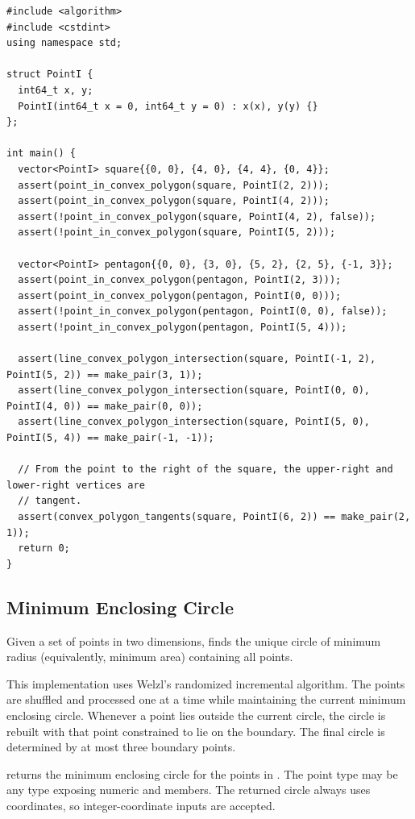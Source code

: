 \begin{lstlisting}[style=cpp]
#include <algorithm>
#include <cstdint>
using namespace std;

struct PointI {
  int64_t x, y;
  PointI(int64_t x = 0, int64_t y = 0) : x(x), y(y) {}
};

int main() {
  vector<PointI> square{{0, 0}, {4, 0}, {4, 4}, {0, 4}};
  assert(point_in_convex_polygon(square, PointI(2, 2)));
  assert(point_in_convex_polygon(square, PointI(4, 2)));
  assert(!point_in_convex_polygon(square, PointI(4, 2), false));
  assert(!point_in_convex_polygon(square, PointI(5, 2)));

  vector<PointI> pentagon{{0, 0}, {3, 0}, {5, 2}, {2, 5}, {-1, 3}};
  assert(point_in_convex_polygon(pentagon, PointI(2, 3)));
  assert(point_in_convex_polygon(pentagon, PointI(0, 0)));
  assert(!point_in_convex_polygon(pentagon, PointI(0, 0), false));
  assert(!point_in_convex_polygon(pentagon, PointI(5, 4)));

  assert(line_convex_polygon_intersection(square, PointI(-1, 2), PointI(5, 2)) == make_pair(3, 1));
  assert(line_convex_polygon_intersection(square, PointI(0, 0), PointI(4, 0)) == make_pair(0, 0));
  assert(line_convex_polygon_intersection(square, PointI(5, 0), PointI(5, 4)) == make_pair(-1, -1));

  // From the point to the right of the square, the upper-right and lower-right vertices are
  // tangent.
  assert(convex_polygon_tangents(square, PointI(6, 2)) == make_pair(2, 1));
  return 0;
}
\end{lstlisting}
\subsection{Minimum Enclosing Circle}
\label{sec:7.3.5}
Given a set of points in two dimensions, finds the unique circle of minimum radius (equivalently, minimum area) containing all points.

This implementation uses Welzl's randomized incremental algorithm. The points are shuffled and processed one at a time while maintaining the current minimum enclosing circle. Whenever a point lies outside the current circle, the circle is rebuilt with that point constrained to lie on the boundary. The final circle is determined by at most three boundary points.

\begin{compactitem}
  \item {} returns the minimum enclosing circle for the points in . The point type may be any type exposing numeric  and  members. The returned circle always uses  coordinates, so integer-coordinate inputs are accepted.
\end{compactitem}

